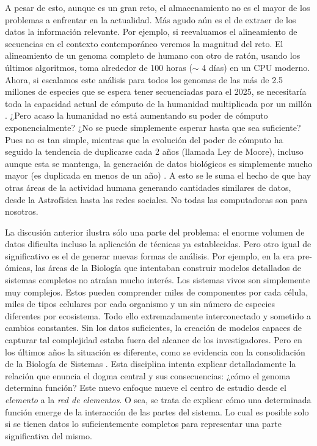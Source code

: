 A pesar de esto, aunque es un gran reto, el almacenamiento no es el mayor de los problemas a enfrentar en la actualidad.
Más agudo aún es el de extraer de los datos la información relevante.
Por ejemplo, si reevaluamos el alineamiento de secuencias en el contexto contemporáneo veremos la magnitud del reto.
El alineamiento de un genoma completo de humano con otro de ratón, usando los últimos algoritmos, toma alrededor de 100 horas ($\sim$ 4 días) en un CPU moderno.
Ahora, si escalamos este análisis para todos los genomas de las más de 2.5 millones de especies que se espera tener secuenciadas para el 2025, se necesitaría toda la capacidad actual de cómputo de la humanidad multiplicada por un millón \cite{stephensBigDataAstronomical2015}.
¿Pero acaso la humanidad no está aumentando su poder de cómputo exponencialmente? ¿No se puede simplemente esperar hasta que sea suficiente?
Pues no es tan simple, mientras que la evolución del poder de cómputo ha seguido la tendencia de duplicarse cada 2 años (llamada Ley de Moore), incluso aunque esta se mantenga, la generación de datos biológicos es simplemente mucho mayor (es duplicada en menos de un año) \cite{stephensBigDataAstronomical2015}.
A esto se le suma el hecho de que hay otras áreas de la actividad humana generando cantidades similares de datos, desde la Astrofísica hasta las redes sociales.
No todas las computadoras son para nosotros.

La discusión anterior ilustra sólo una parte del problema: el enorme volumen de datos dificulta incluso la aplicación de técnicas ya establecidas.
Pero otro igual de significativo es el de generar nuevas formas de análisis.
Por ejemplo, en la era pre-ómicas, las áreas de la Biología que intentaban construir modelos detallados de sistemas completos no atraían mucho interés.
Los sistemas vivos son simplemente muy complejos. 
Estos pueden comprender miles de componentes por cada célula, miles de tipos celulares por cada organismo y un sin número de especies diferentes por ecosistema.
Todo ello extremadamente interconectado y sometido a cambios constantes.
Sin los datos suficientes, la creación de modelos capaces de capturar tal complejidad estaba fuera del alcance de los investigadores.
Pero en los últimos años la situación es diferente, como se evidencia con la consolidación de la Biología de Sistemas \cite{likicSystemsBiologyNext2010a}.
Esta disciplina intenta explicar detalladamente la relación que enuncia el dogma central y sus consecuencias:
¿cómo el genoma determina función?
Este nuevo enfoque mueve el centro de estudio desde el \textit{elemento} a la \textit{red de elementos}.
O sea, se trata de explicar cómo una determinada función emerge de la interacción de las partes del sistema.
Lo cual es posible  solo si se tienen datos lo suficientemente completos para representar una parte significativa del mismo.

